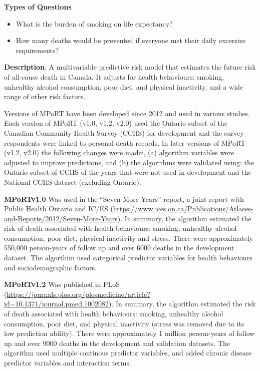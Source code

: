 \documentclass[]{book}
\providecommand{\tightlist}{%
  \setlength{\itemsep}{0pt}\setlength{\parskip}{0pt}}
\begin{document}
\textbf{Types of Questions}

\begin{itemize}
\tightlist
\item
  What is the burden of smoking on life expectancy?
\item
  How many deaths would be prevented if everyone met their daily
  excersize requirements?
\end{itemize}

\textbf{Description}: A multivariable predictive risk model that
estimates the future risk of all-cause death in Canada. It adjusts for
health behaviours: smoking, unhealthy alcohol consumption, poor diet,
and physical inactivity, and a wide range of other risk factors.

Versions of MPoRT have been developed since 2012 and used in various
studies. Each version of MPoRT (v1.0, v1.2, v2.0) used the Ontario
subset of the Canadian Community Health Survey (CCHS) for development
and the survey respondents were linked to personal death records. In
later versions of MPoRT (v1.2, v2.0) the following changes were made:,
(a) algorithm variables were adjusted to improve predictions, and (b)
the algorithms were validated using: the Ontario subset of CCHS of the
years that were not used in development and the National CCHS dataset
(excluding Ontario).

\textbf{MPoRTv1.0} Was used in the ``Seven More Years'' report, a joint
report with Public Health Ontario and IC/ES
(\url{https://www.ices.on.ca/Publications/Atlases-and-Reports/2012/Seven-More-Years}).
In summary, the algorithm estimated the risk of death associated with
health behaviours: smoking, unhealthy alcohol consumption, poor diet,
physical inactivity and stress. There were approximately 550,000
person-years of follow up and over 6000 deaths in the development
dataset. The algorthim used categorical predictor variables for health
behaviours and sociodemographic factors.

\textbf{MPoRTv1.2} Was published in PLoS
(\url{https://journals.plos.org/plosmedicine/article?id=10.1371/journal.pmed.1002082}).
In summary, the algorithm estimated the risk of death associated with
health behaviours: smoking, unhealthy alcohol consumption, poor diet,
and physical inactivity (stress was removed due to its low prediction
ability). There were approximately 1 million person-years of follow up
and over 9000 deaths in the development and validation datasets. The
algorithm used multiple continous predictor variables, and added chronic
disease predictor variables and interaction terms.
\end{document}
